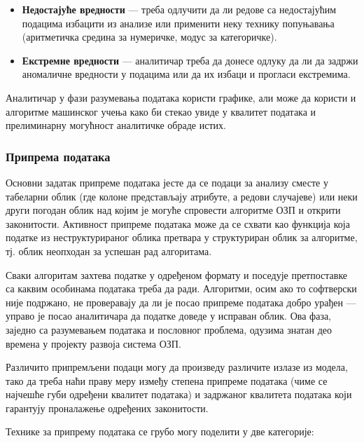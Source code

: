 \begin{itemize}
  \item \textbf{Недостајуће вредности} — треба одлучити да ли редове са недостајућим подацима избацити из анализе или применити неку технику попуњавања (аритметичка средина за нумеричке, модус за категоричке).
  \item \textbf{Екстремне вредности} — аналитичар треба да донесе одлуку да ли да задржи аномаличне вредности у подацима или да их избаци и прогласи екстремима.
\end{itemize}
Аналитичар у фази разумевања података користи графике, али може да користи и алгоритме машинског учења како би стекао увиде у квалитет података и прелиминарну могућност аналитичке обраде истих.

\subsubsection{Припрема података}
Основни задатак припреме података јесте да се подаци за анализу сместе у табеларни облик (где колоне представљају атрибуте, а редови случајеве) или неки други погодан облик над којим је могуће спровести алгоритме ОЗП и открити законитости. Активност припреме података може да се схвати као функција која податке из неструктурираног облика претвара у структуриран облик за алгоритме, тј. облик неопходан за успешан рад алгоритама.

Сваки алгоритам захтева податке у одређеном формату и поседује претпоставке са каквим особинама података треба да ради. Алгоритми, осим ако то софтверски није подржано, не проверавају да ли је посао припреме података добро урађен — управо је посао аналитичара да податке доведе у исправан облик. Ова фаза, заједно са разумевањем података и пословног проблема, одузима знатан део времена у пројекту развоја система ОЗП.

Различито припремљени подаци могу да произведу различите излазе из модела, тако да треба наћи праву меру између степена припреме података (чиме се најчешће губи одређени квалитет података) и задржаног квалитета података који гарантују проналажење одређених законитости.

Технике за припрему података се грубо могу поделити у две категорије:


